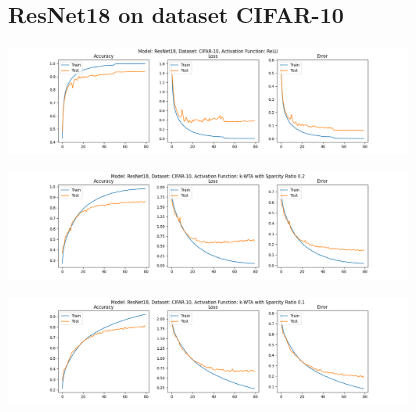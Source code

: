 \documentclass[a4paper]{article}
\begin{document}
		\subsection{ResNet18 on dataset CIFAR-10}
			\begin{center}
				\centering
				\includegraphics[width=400px,keepaspectratio]{ResNet18_CIFAR-10_ReLU.png}
			\end{center}
			\begin{center}
				\centering
				\includegraphics[width=400px,keepaspectratio]{ResNet18_CIFAR-10_k-WTA_0.2.png}
			\end{center}
			\begin{center}
				\centering
				\includegraphics[width=400px,keepaspectratio]{ResNet18_CIFAR-10_k-WTA_0.1.png}
			\end{center}
		
\end{document}
